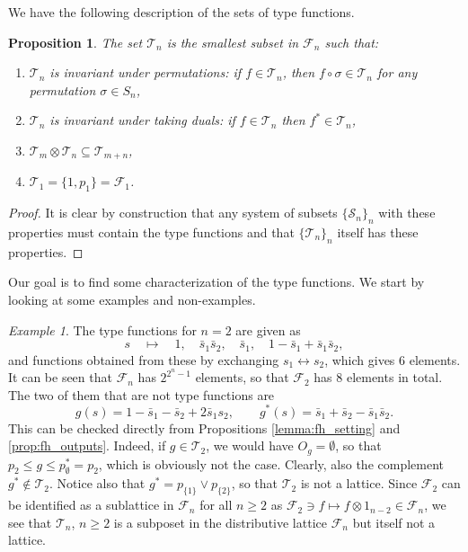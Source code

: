 \documentclass[12pt]{article}
\newtheorem{prop}{Proposition}
\theoremstyle{definition}
\theoremstyle{remark}
\newtheorem{exm}{Example}
\def\Te{\mathcal T}
\def\Fe{\mathcal F}
\def\Se {\mathcal S}
\begin{document}
We have the following  description of the sets of type functions.

\begin{prop}\label{prop:type_min} The set $\Te_n$ is the smallest subset in $\Fe_n$ such
that:
\begin{enumerate}

\item $\Te_n$  is invariant under permutations: if $f\in \Te_n$, then $f\circ \sigma\in
\Te_n$ for any permutation $\sigma\in S_n$,
\item $\Te_n$  is invariant under taking duals: if $f\in \Te_n$ then $f^*\in \Te_n$,
\item $\Te_m\otimes \Te_n\subseteq \Te_{m+n}$,

\item $\Te_1=\{1,p_1\}=\Fe_1$.


\end{enumerate}

\end{prop}


\begin{proof} It is clear by construction that any system of subsets $\{\Se_n\}_n$ with
these properties must contain the type functions and that $\{\Te_n\}_n$ itself has these
properties.

\end{proof}

Our goal is to find some characterization of the type functions.  We start by looking at some examples and non-examples.

\begin{exm}\label{exm:T2} The type functions for $n=2$ are given as 
\[
s\quad \mapsto   \quad 1,\quad \bar s_1\bar s_2,\quad \bar s_1, \quad 1-\bar s_1+\bar
s_1\bar s_2,
\]
and functions  obtained from these by exchanging $s_1\leftrightarrow s_2$, which gives 6
elements.
It can be seen that $\Fe_n$ has $2^{2^n-1}$ elements, so that $\Fe_2$ has 8
elements in total. The two of them that are not type functions are
\[
g(s)=1-\bar s_1-\bar s_2+2\bar s_1s_2,\qquad g^*(s)=\bar s_1+\bar s_2-\bar s_1\bar s_2.
\]
This can be checked directly from Propositions \ref{lemma:fh_setting} and
\ref{prop:fh_outputs}. Indeed, if $g\in \Te_2$, we would have $O_g=\emptyset$, so that
$p_2\le g\le p_\emptyset^*=p_2$, which is obviously not the case. Clearly, also the
complement $g^*\notin \Te_2$. Notice also that $g^*=p_{\{1\}}\vee p_{\{2\}}$, so that
$\Te_2$ is not a lattice. Since $\Fe_2$ can be identified as a sublattice in $\Fe_n$ for
all $n\ge 2$ as $\Fe_2\ni f\mapsto f\otimes 1_{n-2}\in \Fe_n$, we see that $\Te_n$, $n\ge 2$ is a  subposet in the distributive lattice 
$\Fe_n$ but itself not a lattice. 


\end{exm}
\end{document}
